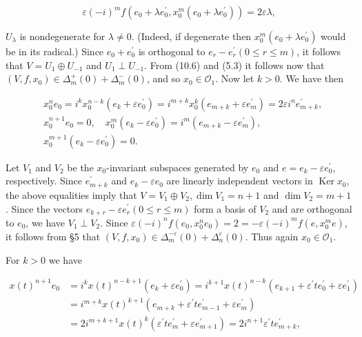 \documentclass[10pt]{article}
\begin{document}
\begin{equation*}
\varepsilon(-i)^{m} f\left(e_{0}+\lambda e_{0}^{\prime}, x_{0}^{m}\left(e_{0}+\lambda e_{0}^{\prime}\right)\right)=2 \varepsilon \lambda, \tag{10.6}
\end{equation*}


$U_{\lambda}$ is nondegenerate for $\lambda \neq 0$. (Indeed, if degenerate then $x_{0}^{m}\left(e_{0}+\lambda e_{0}^{\prime}\right)$ would be in its radical.) Since $e_{0}+e_{0}^{\prime}$ is orthogonal to $e_{r}-e_{r}^{\prime}(0 \leqslant r \leqslant m)$, it follows that $V=U_{1} \oplus U_{-1}$ and $U_{1} \perp U_{-1}$. From (10.6) and (5.3) it follows now that $\left(V, f, x_{0}\right) \in \Delta_{m}^{+}(0)+\Delta_{m}^{-}(0)$, and so $x_{0} \in \mathcal{O}_{1}$. Now let $k>0$. We have then

$$
\begin{aligned}
& x_{0}^{n} e_{0}=i^{k} x_{0}^{n-k}\left(e_{k}+\varepsilon e_{0}^{\prime}\right)=i^{m+k} x_{0}^{k}\left(e_{m+k}+\varepsilon e_{m}^{\prime}\right)=2 \varepsilon i^{n} e_{m+k}^{\prime}, \\
& x_{0}^{n+1} e_{0}=0, \quad x_{0}^{m}\left(e_{k}-\varepsilon e_{0}^{\prime}\right)=i^{m}\left(e_{m+k}-\varepsilon e_{m}^{\prime}\right), \\
& x_{0}^{m+1}\left(e_{k}-\varepsilon e_{0}^{\prime}\right)=0 .
\end{aligned}
$$

Let $V_{1}$ and $V_{2}$ be the $x_{0}$-invariant subspaces generated by $e_{0}$ and $e=e_{k}-\varepsilon e_{0}^{\prime}$, respectively. Since $e_{m+k}^{\prime}$ and $e_{k}-\varepsilon e_{0}$ are linearly independent vectors in $\operatorname{Ker} x_{0}$, the above equalities imply that $V=V_{1} \oplus V_{2}, \operatorname{dim} V_{1}=n+1$ and $\operatorname{dim} V_{2}=m+1$. Since the vectors $e_{k+r}-\varepsilon e_{r}^{\prime}(0 \leqslant r \leqslant m)$ form a basis of $V_{2}$ and are orthogonal to $e_{0}$, we have $V_{1} \perp V_{2}$. Since $\varepsilon(-i)^{n} f\left(e_{0}, x_{0}^{n} e_{0}\right)=2=-\varepsilon(-i)^{m} f\left(e, x_{0}^{m} e\right)$, it follows from §5 that $\left(V, f, x_{0}\right) \in \Delta_{m}^{-\varepsilon}(0)+\Delta_{n}^{\varepsilon}(0)$. Thus again $x_{0} \in \mathcal{O}_{1}$.

For $k>0$ we have

$$
\begin{aligned}
x(t)^{n+1} e_{0} & =i^{k} x(t)^{n-k+1}\left(e_{k}+\varepsilon e_{0}^{\prime}\right)=i^{k+1} x(t)^{n-k}\left(e_{k+1}+\varepsilon^{\prime} t e_{0}^{\prime}+\varepsilon e_{1}^{\prime}\right) \\
& =i^{m+k} x(t)^{k+1}\left(e_{m+k}+\varepsilon^{\prime} t e_{m-1}^{\prime}+\varepsilon e_{m}^{\prime}\right) \\
& =2 i^{m+k+1} x(t)^{k}\left(\varepsilon^{\prime} t e_{m}^{\prime}+\varepsilon e_{m+1}^{\prime}\right)=2 i^{n+1} \varepsilon^{\prime} t e_{m+k}^{\prime},
\end{aligned}
$$
\end{document}
